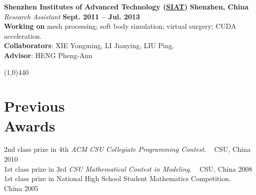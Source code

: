 \documentclass[margin,line]{resume}
\begin{document}
\begin{resume}

    \textbf{Shenzhen Institutes of Advanced Technology (\href{http://english.siat.cas.cn/}{SIAT})}   \hfill \textbf{Shenzhen, China} \\
    \textsl{Research Assistant}                                                              \hfill \textbf{Sept. 2011 -- Jul. 2013} \\
    \textbf{Working on} mesh processing; soft body simulation; virtual surgery; CUDA acceleration. \\
    \textbf{Collaborators}: XIE Yongming, LI Jianying, LIU Ping. \\
    \textbf{Advisor}: HENG Pheng-Ann

    \vspace{-5.0mm}
    \line(1,0){440}
    \vspace{-5.0mm}

    \section{\mysidestyle Previous \\Awards}

    2nd class prize in 4th \textsl{ACM CSU Collegiate Programming Contest}. ~ CSU, China    \hfill 2010      \\
    1st class prize in 3rd \textsl{CSU Mathematical Contest in Modeling}. ~ CSU, China      \hfill 2008      \\
    1st class prize in National High School Student Mathematics Competition. ~ China        \hfill 2005      \\







\end{resume}
\end{document}
